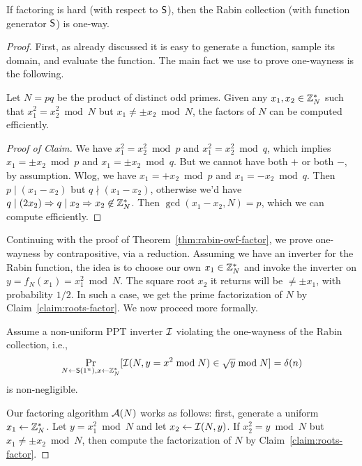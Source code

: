 \documentclass[11pt]{article}
\begin{document}
\begin{theorem}
  \label{thm:rabin-owf-factor}
  If factoring is hard (with respect to $\mathsf{S}$), then the Rabin
  collection (with function generator $\mathsf{S}$) is one-way.
\end{theorem}

\begin{proof}
  First, as already discussed it is easy to generate a function,
  sample its domain, and evaluate the function.  The main fact we use
  to prove one-wayness is the following.

  \begin{claim}
    \label{claim:roots-factor}
    Let $N = pq$ be the product of distinct odd primes.  Given any
    $x_{1}, x_{2} \in \mathbb{Z}_N^{*}$ such that $x_{1}^{2} = x_{2}^{2} \bmod
    N$ but $x_{1} \neq \pm x_{2} \bmod N$, the factors of $N$ can be
    computed efficiently.
  \end{claim}

  \begin{proof}[Proof of Claim]
    We have $x_{1}^{2} = x_{2}^{2} \bmod p$ and $x_{1}^{2} = x_{2}^{2}
    \bmod q$, which implies $x_{1} = \pm x_{2} \bmod p$ and $x_{1} =
    \pm x_{2} \bmod q$.  But we cannot have both $+$ or both $-$, by
    assumption.  Wlog, we have $x_{1} = + x_{2} \bmod p$ and $x_{1} =
    - x_{2} \bmod q$.  Then $p \mid (x_{1}-x_{2})$ but $q \nmid
    (x_{1}-x_{2})$, otherwise we'd have $q \mid (2x_{2}) \Rightarrow q
    \mid x_{2} \Rightarrow x_{2} \not\in \mathbb{Z}_N^{*}$.  Then
    $\gcd(x_{1}-x_{2},N) = p$, which we can compute efficiently.
  \end{proof}

  Continuing with the proof of Theorem~\ref{thm:rabin-owf-factor}, we
  prove one-wayness by contrapositive, via a reduction.  Assuming we
  have an inverter for the Rabin function, the idea is to choose our
  own $x_{1} \in \mathbb{Z}_N^{*}$ and invoke the inverter on $y = f_{N}(x_{1})
  = x_{1}^{2} \bmod N$.  The square root $x_{2}$ it returns will be
  $\neq \pm x_{1}$, with probability $1/2$.  In such a case, we get
  the prime factorization of $N$ by Claim~\ref{claim:roots-factor}.
  We now proceed more formally.

  Assume a non-uniform PPT inverter $\mathcal{I}$ violating the one-wayness
  of the Rabin collection, i.e., \[ \Pr_{N \gets \mathsf{S}(1^{n}), x
    \gets \mathbb{Z}_N^{*}}[\mathcal{I}(N, y = x^{2} \bmod N) \in \sqrt{y} \bmod N] =
  \delta(n) \] is non-negligible.

  Our factoring algorithm $\mathcal{A}(N)$ works as follows: first, generate
  a uniform $x_{1} \gets \mathbb{Z}_N^{*}$.  Let $y = x_{1}^{2} \bmod N$ and
  let $x_{2} \gets \mathcal{I}(N, y)$.  If $x_{2}^{2} = y \bmod N$ but $x_{1}
  \neq \pm x_{2} \bmod N$, then compute the factorization of $N$ by
  Claim~\ref{claim:roots-factor}.


\end{proof}
\end{document}
